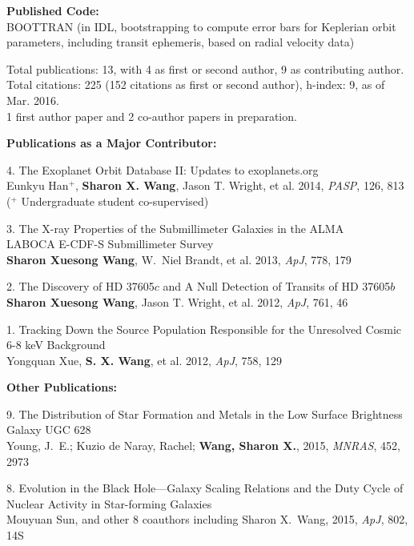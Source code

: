 \begin{small}
{\bf Published Code:} \\
BOOTTRAN (in IDL, bootstrapping to compute
error bars for Keplerian orbit parameters, including transit
ephemeris, based on radial velocity data)




Total publications: 13, with 4 as first or second author, 9 as
contributing author.\\ Total citations: 225 (152 citations as first or
second author), h-index: 9, as of Mar. 2016. \\
1 first author paper and 2 co-author papers in preparation.

\vspace{10pt}
{\bf Publications as a Major Contributor:}
\vspace{10pt}

4. The Exoplanet Orbit Database II: Updates to exoplanets.org \\
Eunkyu Han$^+$, {\bf Sharon X. Wang}, Jason T. Wright, et al. 2014, {\it
  PASP}, 126, 813\\
($^+$ Undergraduate student co-supervised)


3. The X-ray Properties of the Submillimeter Galaxies in the ALMA \\
LABOCA E-CDF-S Submillimeter Survey \\
{\bf Sharon Xuesong Wang}, W.\ Niel Brandt, et al. 2013, {\it ApJ}, 778, 179


2. The Discovery of HD 37605$c$ and A Null Detection of Transits of HD
37605$b$ \\
{\bf Sharon Xuesong Wang}, Jason T. Wright, et al. 2012, {\it ApJ}, 761, 46


1. Tracking Down the Source Population Responsible for the Unresolved Cosmic 6-8 keV Background \\
Yongquan Xue, {\bf S. X. Wang}, et al. 2012, {\it ApJ}, 758, 129

\vspace{10pt}
{\bf Other Publications:}


9. The Distribution of Star Formation and Metals in the Low Surface
Brightness Galaxy UGC 628 \\
Young, J.\ E.; Kuzio de Naray, Rachel; \textbf{Wang, Sharon X.}, 2015,
{\it MNRAS}, 452, 2973


8. Evolution in the Black Hole---Galaxy Scaling Relations and the Duty
Cycle of Nuclear Activity in Star-forming Galaxies \\
Mouyuan Sun, and other 8 coauthors including Sharon X.\ Wang,
2015, {\it ApJ}, 802, 14S



\end{small}
